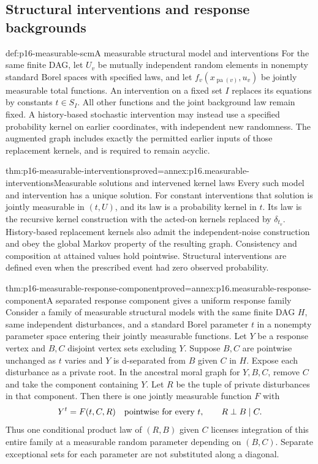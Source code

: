 \subsection{Structural interventions and response backgrounds}

\begin{hbdefinition}{def:p16-measurable-scm}{A measurable structural model and interventions}
For the same finite DAG, let \(U_v\) be mutually independent random
elements in nonempty standard Borel spaces with specified laws, and let
\(f_v(x_{\operatorname{pa}(v)},u_v)\) be jointly measurable total functions.
An intervention on a fixed set \(I\) replaces its equations by constants
\(t\in S_I\). All other functions and the joint background law remain
fixed. A history-based stochastic intervention may instead use a specified
probability kernel on earlier coordinates, with independent new randomness.
The augmented graph includes exactly the permitted earlier inputs of
those replacement kernels, and is required to remain acyclic.
\end{hbdefinition}

\begin{hbtheorem}{thm:p16-measurable-interventions}{proved=annex:p16.measurable-interventions}{Measurable solutions and intervened kernel laws}
Every such model and intervention has a unique solution. For constant
interventions that solution is jointly measurable in \((t,U)\), and its
law is a probability kernel in \(t\). Its law is the recursive kernel
construction with the acted-on kernels replaced by \(\delta_{t_v}\).
History-based replacement kernels also admit the independent-noise
construction and obey the global Markov property of the resulting graph.
Consistency and composition at attained values hold pointwise. Structural
interventions are defined even when the prescribed event had zero
observed probability.
\end{hbtheorem}

\begin{hblemma}{thm:p16-measurable-response-component}{proved=annex:p16.measurable-response-component}{A separated response component gives a uniform response family}
Consider a family of measurable structural models with the same finite
DAG \(H\), same independent disturbances, and a standard Borel parameter
\(t\) in a nonempty parameter space entering their jointly measurable functions.
Let \(Y\) be a response vertex and \(B,C\) disjoint vertex sets excluding
\(Y\). Suppose \(B,C\) are pointwise unchanged as \(t\) varies and \(Y\) is d-separated
from \(B\) given \(C\) in \(H\). Expose each disturbance as a private
root. In the ancestral moral graph for \(Y,B,C\), remove \(C\) and
take the component containing \(Y\). Let \(R\) be the tuple of private
disturbances in that component. Then there is one jointly measurable
function \(F\) with
\[
 Y^t=F(t,C,R)\quad\hbox{pointwise for every }t,
 \qquad R\perp B\mid C.
\]
Thus one conditional product law of \((R,B)\) given \(C\) licenses
integration of this entire family at a measurable random parameter
depending on \((B,C)\). Separate exceptional sets for each parameter
are not substituted along a diagonal.
\end{hblemma}

